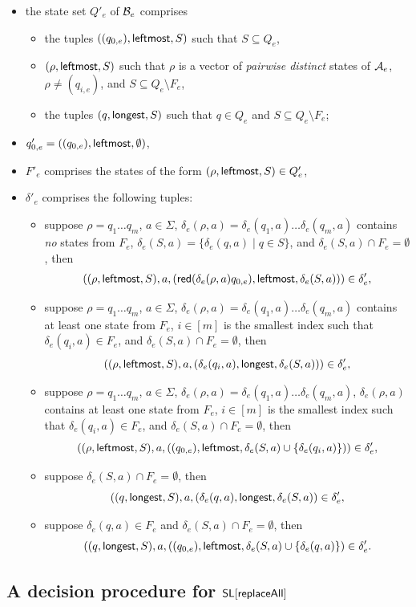 \begin{itemize}
	\item the state set $Q'_e$ of $\mathcal{B}_e$ comprises 
	\begin{itemize}
		\item the tuples $((q_{0,e}), {\sf leftmost}, S)$ such that $S \subseteq Q_e$,
		\item $(\rho, {\sf leftmost}, S)$ such that  $\rho$ is a vector of \emph{pairwise distinct} states of $\mathcal{A}_e$, $\rho \neq (q_{i,e})$, and $S \subseteq Q_e \setminus F_e$, 
		\item the tuples $(q, {\sf longest}, S)$ such that $q \in Q_e$ and $S \subseteq Q_e \setminus F_e$;
	\end{itemize}
	\item $q'_{0,e}= ((q_{0,e}), {\sf leftmost}, \emptyset)$,
	\item $F'_{e}$ comprises the states of the form $(\rho, {\sf leftmost}, S) \in Q'_e$,
	\item $\delta'_e$ comprises the following tuples: 
	\begin{itemize}
		\item suppose $\rho = q_1 \dots q_m$,  $a \in \Sigma$, $\delta_e(\rho, a) = \delta_e(q_1,a) \dots \delta_e(q_m, a)$ contains \emph{no} states from $F_e$, $\delta_e(S,a) = \{\delta_e(q,a) \mid q \in S \}$, and $\delta_e(S,a) \cap F_e = \emptyset$, then 
		$$((\rho, {\sf leftmost}, S), a, (\mathsf{red}(\delta_e(\rho,a) q_{0,e}), {\sf leftmost}, \delta_e(S,a))) \in \delta'_e,$$ 
		\item suppose $\rho = q_1 \dots q_m$, $a \in \Sigma$, $\delta_e(\rho, a) = \delta_e(q_1,a) \dots \delta_e(q_m, a)$ contains at least one state from $F_e$, $i \in [m]$ is the smallest index such that $\delta_e(q_i, a) \in F_e$,   and $\delta_e(S,a) \cap F_e = \emptyset$, then 
		$$((\rho, {\sf leftmost}, S), a, (\delta_e(q_i, a), {\sf longest}, \delta_e(S,a))) \in  \delta'_e,$$ 
		\item suppose $\rho = q_1 \dots q_m$, $a \in \Sigma$, $\delta_e(\rho, a) = \delta_e(q_1,a) \dots \delta_e(q_m, a)$, $\delta_e(\rho,a)$ contains at least one state from $F_e$, $i \in [m]$ is the smallest index such that $\delta_e(q_i, a) \in F_e$, and $\delta_e(S,a) \cap F_e = \emptyset$, then 
		$$((\rho, {\sf leftmost}, S), a, ((q_{0,e}), {\sf leftmost}, \delta_e(S,a) \cup \{\delta_e(q_i, a)\})) \in  \delta'_e,$$ 
		\item suppose $\delta_e(S,a) \cap F_e = \emptyset$, then 
		$$((q, {\sf longest}, S), a, (\delta_e(q,a), {\sf longest}, \delta_e(S,a)) \in \delta'_e,$$
		\item suppose $\delta_e(q,a) \in F_e$ and $\delta_e(S,a) \cap F_e = \emptyset$, then 
		$$((q, {\sf longest}, S), a, ((q_{0,e}), {\sf leftmost}, \delta_e(S,a) \cup \{\delta_e(q,a)\}) \in \delta'_e.$$
	\end{itemize}
\end{itemize}



\subsection{A decision procedure for $\mathsf{SL}[\mathsf{replaceAll}]$}



